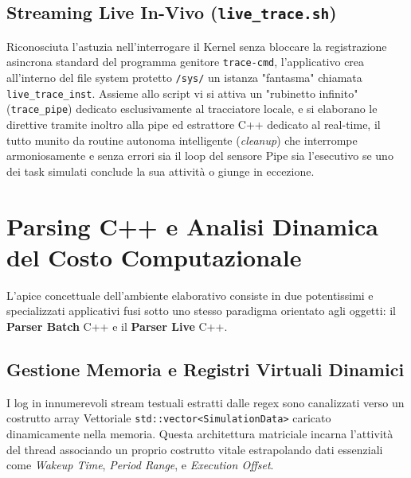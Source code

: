 \documentclass[a4paper,12pt]{report}
\begin{document}
\section{Streaming Live In-Vivo (\texttt{live\_trace.sh})}
Riconosciuta l'astuzia nell'interrogare il Kernel senza bloccare la registrazione asincrona standard del programma genitore \verb!trace-cmd!, l'applicativo crea all'interno del file system protetto \verb!/sys/! un istanza "fantasma" chiamata \verb!live_trace_inst!. Assieme allo script vi si attiva un "rubinetto infinito" (\verb!trace_pipe!) dedicato esclusivamente al tracciatore locale, e si elaborano le direttive tramite inoltro alla pipe ed estrattore C++ dedicato al real-time, il tutto munito da routine autonoma intelligente (\textit{cleanup}) che interrompe armoniosamente e senza errori sia il loop del sensore Pipe sia l'esecutivo se uno dei task simulati conclude la sua attività o giunge in eccezione.

\chapter{Parsing C++ e Analisi Dinamica del Costo Computazionale}
L'apice concettuale dell'ambiente elaborativo consiste in due potentissimi e specializzati applicativi fusi sotto uno stesso paradigma orientato agli oggetti: il \textbf{Parser Batch} C++ e il \textbf{Parser Live} C++.

\section{Gestione Memoria e Registri Virtuali Dinamici}
I log in innumerevoli stream testuali estratti dalle regex sono canalizzati verso un costrutto array Vettoriale \verb!std::vector<SimulationData>! caricato dinamicamente nella memoria. Questa architettura matriciale incarna l'attività del thread associando un proprio costrutto vitale estrapolando dati essenziali come \textit{Wakeup Time}, \textit{Period Range}, e \textit{Execution Offset}.
\end{document}
